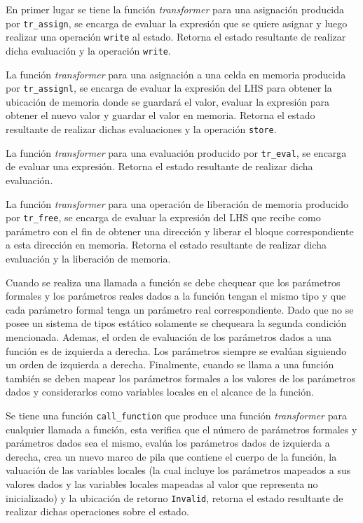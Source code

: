 En primer lugar se tiene la función \textit{transformer} para una asignación producida por \verb|tr_assign|, se encarga de evaluar la expresión que se quiere asignar y luego realizar una operación \verb|write| al estado.
Retorna el estado resultante de realizar dicha evaluación y la operación \verb|write|.

La función \textit{transformer} para una asignación a una celda en memoria producida por \verb|tr_assignl|, se encarga de evaluar la expresión del LHS para obtener la ubicación de memoria donde se guardará el valor, evaluar la expresión para obtener el nuevo valor y guardar el valor en memoria.
Retorna el estado resultante de realizar dichas evaluaciones y la operación \verb|store|.

La función \textit{transformer} para una evaluación producido por \verb|tr_eval|, se encarga de evaluar una expresión.
Retorna el estado resultante de realizar dicha evaluación.

La función \textit{transformer} para una operación de liberación de memoria producido por \verb|tr_free|, se encarga de evaluar la expresión del LHS que recibe como parámetro con el fin de obtener una dirección y liberar el bloque correspondiente a esta dirección en memoria.
Retorna el estado resultante de realizar dicha evaluación y la liberación de memoria.

Cuando se realiza una llamada a función se debe chequear que los parámetros formales y los parámetros reales dados a la función tengan el mismo tipo y que cada parámetro formal tenga un parámetro real correspondiente.
Dado que no se posee un sistema de tipos estático solamente se chequeara la segunda condición mencionada.
Ademas, el orden de evaluación de los parámetros dados a una función es de izquierda a derecha.
Los parámetros siempre se evalúan siguiendo un orden de izquierda a derecha.
Finalmente, cuando se llama a una función también se deben mapear los parámetros formales a los valores de los parámetros dados y considerarlos como variables locales en el alcance de la función.

Se tiene una función \verb|call_function| que produce una función \textit{transformer} para cualquier llamada a función, esta verifica que el número de parámetros formales y parámetros dados sea el mismo, evalúa los parámetros dados de izquierda a derecha, crea un nuevo marco de pila que contiene el cuerpo de la función, la valuación de las variables locales (la cual incluye los parámetros mapeados a sus valores dados y las variables locales mapeadas al valor que representa no inicializado) y la ubicación de retorno \verb|Invalid|, retorna el estado resultante de realizar dichas operaciones sobre el estado.

